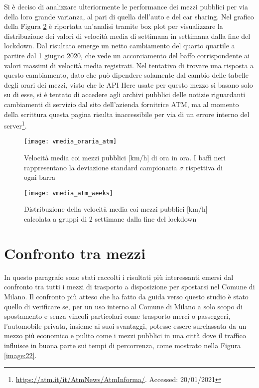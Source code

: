 Si è deciso di analizzare ulteriormente le performance dei mezzi pubblici per via della loro grande varianza, al pari di quella dell'auto e del car sharing. Nel grafico della Figura \ref{image:29} è riportata un'analisi tramite box plot per visualizzare la distribuzione dei valori di velocità media di settimana in settimana dalla fine del lockdown. Dal risultato emerge un netto cambiamento del quarto quartile a partire dal 1 giugno 2020, che vede un accorciamento del baffo corrispondente ai valori massimi di velocità media registrati. Nel tentativo di trovare una risposta a questo cambiamento, dato che può dipendere solamente dal cambio delle tabelle degli orari dei mezzi, visto che le API Here usate per questo mezzo si basano solo su di esse, si è tentato di accedere agli archivi pubblici delle notizie riguardanti cambiamenti di servizio dal sito dell'azienda fornitrice ATM, ma al momento della scrittura questa pagina risulta inaccessibile per via di un errore interno del server\footnote{\url{https://atm.it/it/AtmNews/AtmInforma/}. Accessed: 20/01/2021}.

\begin{figure}[H]
\centering
\texttt{[image: vmedia\_oraria\_atm]}
\caption{Velocità media coi mezzi pubblici [km/h] di ora in ora. I baffi neri rappresentano la deviazione standard campionaria $\sigma$ rispettiva di ogni barra}
\label{image:17}
\end{figure}

\begin{figure}[H]
\centering
\texttt{[image: vmedia\_atm\_weeks]}
\caption{Distribuzione della velocità media coi mezzi pubblici [km/h] calcolata a gruppi di 2 settimane dalla fine del lockdown}
\label{image:29}
\end{figure}

\section{Confronto tra mezzi}

In questo paragrafo sono stati raccolti i risultati più interessanti emersi dal confronto tra tutti i mezzi di trasporto a disposizione per spostarsi nel Comune di Milano. Il confronto più atteso che ha fatto da guida verso questo studio è stato quello di verificare se, per un uso interno al Comune di Milano a solo scopo di spostamento e senza vincoli particolari come trasporto merci o passeggeri, l'automobile privata, insieme ai suoi svantaggi, potesse essere surclassata da un mezzo più economico e pulito come i mezzi pubblici in una città dove il traffico influisce in buona parte sui tempi di percorrenza, come mostrato nella Figura \ref{image:22}.


